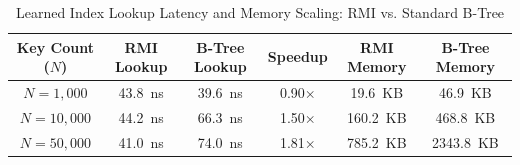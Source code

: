 \begin{table}[t]
\centering
\caption{Learned Index Lookup Latency and Memory Scaling: RMI vs. Standard B-Tree}
\label{tab:rmi_vs_btree}
\begin{tabular}{cccccc}
\hline
\textbf{Key Count ($N$)} & \textbf{RMI Lookup} & \textbf{B-Tree Lookup} & \textbf{Speedup} & \textbf{RMI Memory} & \textbf{B-Tree Memory} \\
\hline
$N = 1,000$ & 43.8~ns & 39.6~ns & 0.90$\times$ & 19.6~KB & 46.9~KB \\
$N = 10,000$ & 44.2~ns & 66.3~ns & 1.50$\times$ & 160.2~KB & 468.8~KB \\
$N = 50,000$ & 41.0~ns & 74.0~ns & 1.81$\times$ & 785.2~KB & 2343.8~KB \\
\hline
\end{tabular}
\end{table}
